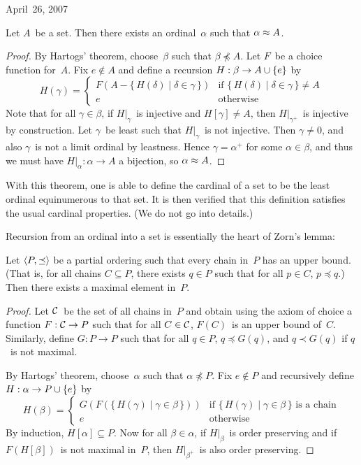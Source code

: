 \begin{lecture}{April~26, 2007}
\begin{thm}[Numeration]
Let \(A\)~be a set. Then there exists an ordinal~\(\alpha\) such that \(\alpha\approx A\).
\end{thm}
\begin{proof}
By Hartogs' theorem, choose~\(\beta\) such that \(\beta\not\preceq A\). Let \(F\)~be a choice function for~\(A\). Fix \(e\not\in A\) and define a recursion \(H:\beta\to A\cup\{e\}\) by
\[H(\gamma)=
\begin{cases}
F(A-\{\,H(\delta)\mid\delta\in\gamma\,\})&\text{if }\{\,H(\delta)\mid\delta\in\gamma\,\}\ne A\\
e&\text{otherwise}
\end{cases}\]
Note that for all \(\gamma\in\beta\), if \(H|_{\gamma}\)~is injective and \(H[\gamma]\ne A\), then \(H|_{\gamma^+}\)~is injective by construction. Let \(\gamma\)~be least such that \(H|_{\gamma}\)~is not injective. Then \(\gamma\ne0\), and also \(\gamma\)~is not a limit ordinal by leastness. Hence \(\gamma=\alpha^+\) for some \(\alpha\in\beta\), and thus we must have \(H|_{\alpha}:\alpha\to A\) a bijection, so \(\alpha\approx A\).
\end{proof}
\noindent With this theorem, one is able to define the cardinal of a set to be the least ordinal equinumerous to that set. It is then verified that this definition satisfies the usual cardinal properties. (We do not go into details.)

Recursion from an ordinal into a set is essentially the heart of Zorn's lemma:
\begin{thm}[Zorn]
Let \(\langle{P},{\preceq}\rangle\) be a partial ordering such that every chain in~\(P\) has an upper bound. (That is, for all chains \(C\subseteq P\), there exists \(q\in P\) such that for all \(p\in C\), \(p\preceq q\).) Then there exists a maximal element in~\(P\).
\end{thm}
\begin{proof}
Let \(\mathcal{C}\)~be the set of all chains in~\(P\) and obtain using the axiom of choice a function \(F:\mathcal{C}\to P\) such that for all \(C\in\mathcal{C}\), \(F(C)\)~is an upper bound of~\(C\). Similarly, define \(G:P\to P\) such that for all \(q\in P\), \(q\preceq G(q)\), and \(q\prec G(q)\) if \(q\)~is not maximal.

By Hartogs' theorem, choose~\(\alpha\) such that \(\alpha\not\preceq P\). Fix \(e\not\in P\) and recursively define \(H:\alpha\to P\cup\{e\}\) by
\[H(\beta)=
\begin{cases}
G(F(\{\,H(\gamma)\mid \gamma\in\beta\,\}))&\text{if }\{\,H(\gamma)\mid\gamma\in\beta\,\}\text{ is a chain}\\
e&\text{otherwise}
\end{cases}\]
By induction, \(H[\alpha]\subseteq P\). Now for all \(\beta\in\alpha\), if \(H|_{\beta}\)~is order preserving and if \(F(H[\beta])\)~is not maximal in~\(P\), then \(H|_{\beta^+}\)~is also order preserving.


\end{proof}
\end{lecture}

